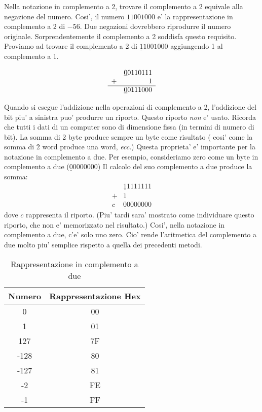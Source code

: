 Nella notazione in complemento a 2, trovare il complemento a 2 equivale
alla negazione del numero. Cosi', il numero $\underline{1}1001000$ e' la
rappresentazione in complemento a 2 di $-56$. Due negazioni dovrebbero
riprodurre il numero originale. Sorprendentemente il complemento a 2 
soddisfa questo requisito. Proviamo ad trovare il complemento a  2
di $\underline{1}1001000$ aggiungendo 1 al complemento a 1.

\[
\begin{array}{rr}
 & \underline{0}0110111 \\
+&                    1 \\ \hline
 & \underline{0}0111000
\end{array}
\]

Quando si esegue l'addizione nella operazioni di complemento a 2, l'addizione
del bit piu' a sinistra puo' produrre un riporto. Questo riporto \emph{non} e'
usato. Ricorda che tutti i dati di un computer sono di dimensione fissa (in
termini di numero di bit). La somma di 2 byte produce sempre un byte come 
risultato ( cosi' come la somma di 2 word produce una word, {\em ecc\/}.) 
Questa proprieta' e' importante per la notazione in complemento a due. Per
esempio, consideriamo zero come un byte in complemento a due ($\underline{0}0000000$)
Il calcolo del suo complemento a due produce la somma:
\[
\begin{array}{rr}
 & \underline{1}1111111 \\
+&                    1 \\ \hline
c& \underline{0}0000000
\end{array}
\]
dove $c$ rappresenta il riporto. (Piu' tardi sara' mostrato come individuare 
questo riporto, che non e' memorizzato nel risultato.) Cosi', nella notazione
in complemento a due, c'e' solo uno zero. Cio' rende l'aritmetica del complemento
a due molto piu' semplice rispetto a quella dei precedenti metodi. 

\begin{table}
\centering
\begin{tabular}{||c|c||}
\hline
Numero & Rappresentazione Hex \\
\hline
0 & 00 \\
1 & 01 \\
127 & 7F \\
-128 & 80 \\
-127 & 81 \\
-2 & FE \\
-1 & FF \\
\hline
\end{tabular}
\caption{Rappresentazione in complemento a due \label{tab:twocomp}}
\end{table}

